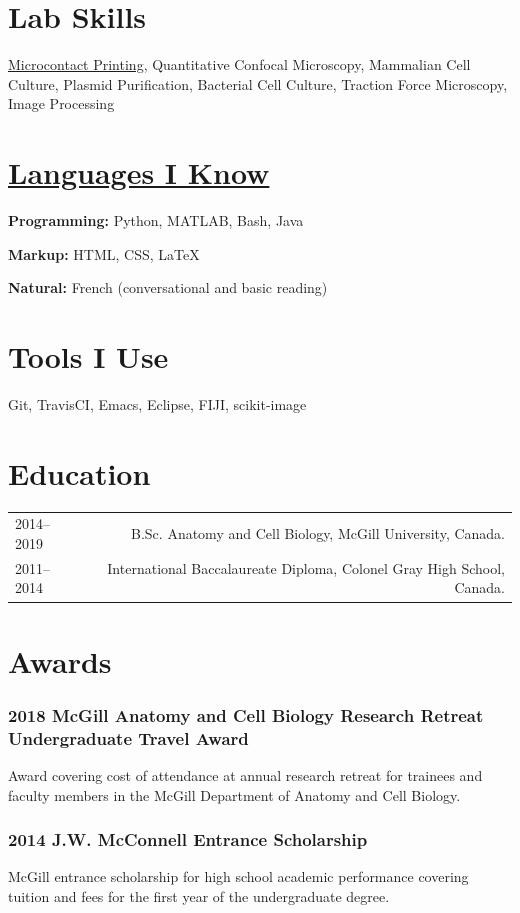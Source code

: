 \documentclass[%
	12pt,%
	]
	{article}
\begin{document}
\section*{Lab Skills}

\href{https://jidicula.github.io/images/micropattern.jpg}{Microcontact Printing}, Quantitative Confocal Microscopy, Mammalian Cell Culture, Plasmid Purification, Bacterial Cell Culture, Traction Force Microscopy, Image Processing


\section*{\href{https://github.com/jidicula}{Languages I Know}}

\textbf{Programming:} Python, MATLAB, Bash, Java

\textbf{Markup:} HTML, CSS, LaTeX

\textbf{Natural:} French (conversational and basic reading)

\section*{Tools I Use}

Git, TravisCI, Emacs, Eclipse, FIJI, scikit-image

\section*{Education}
\begin{tabular}{LR}
2014--2019&B.Sc. Anatomy and Cell Biology, McGill University, Canada.\\[5pt]
2011--2014&International Baccalaureate Diploma, Colonel Gray High School, Canada.\\
\end{tabular}

\section*{Awards}
\subsubsection*{2018 McGill Anatomy and Cell Biology Research Retreat Undergraduate Travel Award}
Award covering cost of attendance at annual research retreat for trainees and faculty members in the McGill Department of Anatomy and Cell Biology.

\subsubsection*{2014 J.W. McConnell Entrance Scholarship}
McGill entrance scholarship for high school academic performance covering tuition and fees for the first year of the undergraduate degree.
\end{document}
